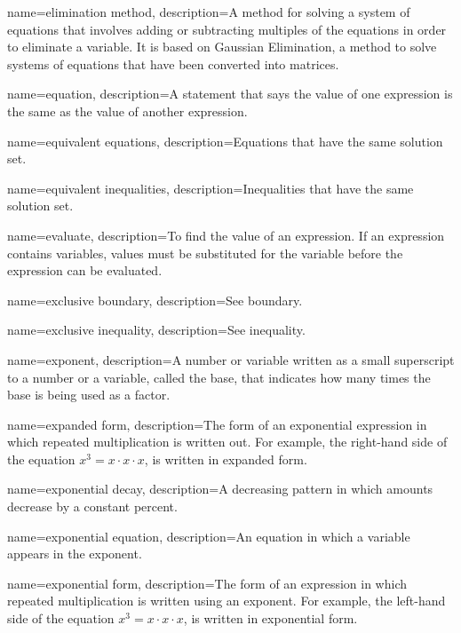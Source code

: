  {
	name=elimination method,
	description={A method for solving a system of equations that involves adding or subtracting multiples of the equations in order to eliminate a variable. It is based on Gaussian Elimination, a method to solve systems of equations that have been converted into matrices.}
}

 {
	name=equation,
	description={A statement that says the value of one expression is the same as the value of another expression.}
}

 {
	name=equivalent equations,
	description={Equations that have the same solution set.}
}

 {
	name=equivalent inequalities,
	description={Inequalities that have the same solution set.}
}

 {
	name=evaluate,
	description={To find the value of an expression. If an expression contains variables, values must be substituted for the variable before the expression can be evaluated.}
}

 {
	name=exclusive boundary,
	description={See \gls{boundary}.}
}

 {
	name=exclusive inequality,
	description={See \gls{inequality}.}
}

 {
	name=exponent,
	description={A number or variable written as a small superscript to a number or a variable, called the \gls{base}, that indicates how many times the base is being used as a factor.}
}

 {
	name=expanded form,
	description={The form of an exponential expression in which repeated multiplication is written out. For example, the right-hand side of the equation $x^3 = x\cdot x \cdot x$, is written in expanded form.}
}

 {
	name=exponential decay,
	description={A decreasing pattern in which amounts decrease by a constant percent.}
}

 {
	name=exponential equation,
	description={An equation in which a variable appears in the exponent.}
}

 {
	name=exponential form,
	description={The form of an expression in which repeated multiplication is written using an exponent. For example, the left-hand side of the equation $x^3 = x\cdot x \cdot x$, is written in exponential form.}
}

